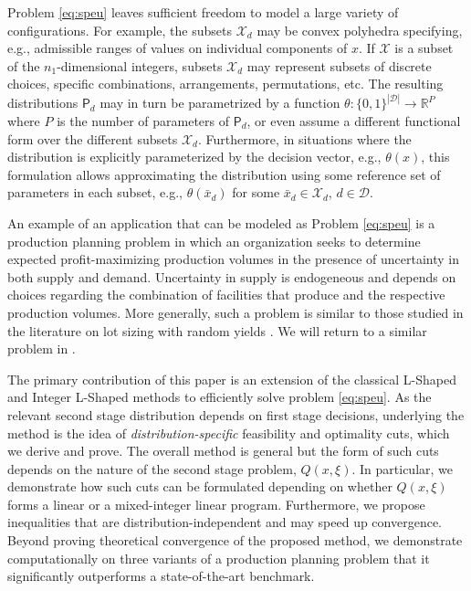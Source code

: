 \documentclass[12pt]{article}
\theoremstyle{thmstylethree}%
\newcommand{\mtc}[1] {\mathcal{#1}}
\newcommand{\pr}[1]{\ensuremath{\mathsf{#1}}}
\def\R{\ensuremath{\mathbb{R}}}
\begin{document}
Problem \eqref{eq:speu} leaves sufficient freedom to model a large variety of configurations. 
For example, the subsets $\mtc{X}_d$ may be convex polyhedra specifying, e.g., admissible ranges of values on individual components of $x$.
If $\mtc{X}$ is a subset of the $n_1$-dimensional integers, subsets $\mtc{X}_d$ may represent subsets of discrete choices, specific combinations, arrangements, permutations, etc.
The resulting distributions $\pr{P}_d$ may in turn be parametrized by a function $\theta:\{0,1\}^{|\mtc{D}|}\to \R^P$ where $P$ is the number of parameters of $\pr{P}_d$, or even assume a different functional form over the different subsets $\mtc{X}_d$. Furthermore, in situations where the distribution is explicitly parameterized by the decision vector, e.g., $\theta\left(x\right)$, this formulation allows approximating the distribution using some reference set of parameters in each subset, e.g., $\theta\left(\bar{x}_d\right)$ for some $\bar{x}_d\in\mtc{X}_d$, $d\in\mtc{D}$.

 An example of an application that can be modeled as Problem \eqref{eq:speu} is a production planning problem in which an organization seeks to determine expected profit-maximizing production volumes in the presence of  uncertainty in both supply and demand. 
Uncertainty in supply is endogeneous and depends on choices regarding the combination of facilities that produce and the respective production volumes. More generally, such a problem is similar to those studied in the literature on lot sizing with random yields \cite{yano1995lot}. We will return to a similar problem in .  


The primary contribution of this paper is an extension of the classical L-Shaped and Integer L-Shaped methods to efficiently solve problem \eqref{eq:speu}. As the relevant second stage distribution depends on first stage decisions, underlying the method is the idea of \textit{distribution-specific} feasibility and optimality cuts, which we derive and prove. The overall method is general but the form of such cuts depends on the nature of the second stage problem, $Q(x,\xi).$ In particular, we demonstrate how such cuts can be formulated depending on whether $Q(x,\xi)$ forms a linear or a mixed-integer linear program. 
Furthermore, we propose inequalities that are distribution-independent and may speed up convergence. Beyond proving theoretical convergence of the proposed method, we demonstrate computationally on three variants of a production planning problem that it significantly outperforms a state-of-the-art benchmark. 
\end{document}
